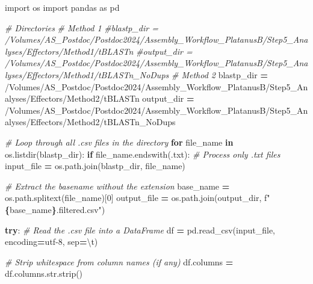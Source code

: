 \documentclass[
]{book}
\newenvironment{Shaded}{\begin{snugshade}}{\end{snugshade}}
\newcommand{\BuiltInTok}[1]{#1}
\newcommand{\CharTok}[1]{\textcolor[rgb]{0.31,0.60,0.02}{#1}}
\newcommand{\CommentTok}[1]{\textcolor[rgb]{0.56,0.35,0.01}{\textit{#1}}}
\newcommand{\ControlFlowTok}[1]{\textcolor[rgb]{0.13,0.29,0.53}{\textbf{#1}}}
\newcommand{\DecValTok}[1]{\textcolor[rgb]{0.00,0.00,0.81}{#1}}
\newcommand{\ImportTok}[1]{#1}
\newcommand{\KeywordTok}[1]{\textcolor[rgb]{0.13,0.29,0.53}{\textbf{#1}}}
\newcommand{\NormalTok}[1]{#1}
\newcommand{\OperatorTok}[1]{\textcolor[rgb]{0.81,0.36,0.00}{\textbf{#1}}}
\newcommand{\SpecialCharTok}[1]{\textcolor[rgb]{0.81,0.36,0.00}{\textbf{#1}}}
\newcommand{\SpecialStringTok}[1]{\textcolor[rgb]{0.31,0.60,0.02}{#1}}
\newcommand{\StringTok}[1]{\textcolor[rgb]{0.31,0.60,0.02}{#1}}
\begin{document}
\begin{Shaded}
\begin{Highlighting}[]
\ImportTok{import}\NormalTok{ os}
\ImportTok{import}\NormalTok{ pandas }\ImportTok{as}\NormalTok{ pd}

\CommentTok{\# Directories}
\CommentTok{\# Method 1}
\CommentTok{\#blastp\_dir = \textquotesingle{}/Volumes/AS\_Postdoc/Postdoc2024/Assembly\_Workflow\_PlatanusB/Step5\_Analyses/Effectors/Method1/tBLASTn\textquotesingle{}}
\CommentTok{\#output\_dir = \textquotesingle{}/Volumes/AS\_Postdoc/Postdoc2024/Assembly\_Workflow\_PlatanusB/Step5\_Analyses/Effectors/Method1/tBLASTn\_NoDups\textquotesingle{}}
\CommentTok{\# Method 2}
\NormalTok{blastp\_dir }\OperatorTok{=} \StringTok{\textquotesingle{}/Volumes/AS\_Postdoc/Postdoc2024/Assembly\_Workflow\_PlatanusB/Step5\_Analyses/Effectors/Method2/tBLASTn\textquotesingle{}}
\NormalTok{output\_dir }\OperatorTok{=} \StringTok{\textquotesingle{}/Volumes/AS\_Postdoc/Postdoc2024/Assembly\_Workflow\_PlatanusB/Step5\_Analyses/Effectors/Method2/tBLASTn\_NoDups\textquotesingle{}}

\CommentTok{\# Loop through all .csv files in the directory}
\ControlFlowTok{for}\NormalTok{ file\_name }\KeywordTok{in}\NormalTok{ os.listdir(blastp\_dir):}
    \ControlFlowTok{if}\NormalTok{ file\_name.endswith(}\StringTok{\textquotesingle{}.txt\textquotesingle{}}\NormalTok{):  }\CommentTok{\# Process only .txt files}
\NormalTok{        input\_file }\OperatorTok{=}\NormalTok{ os.path.join(blastp\_dir, file\_name)}
        
        \CommentTok{\# Extract the basename without the extension}
\NormalTok{        base\_name }\OperatorTok{=}\NormalTok{ os.path.splitext(file\_name)[}\DecValTok{0}\NormalTok{]}
\NormalTok{        output\_file }\OperatorTok{=}\NormalTok{ os.path.join(output\_dir, }\SpecialStringTok{f"}\SpecialCharTok{\{}\NormalTok{base\_name}\SpecialCharTok{\}}\SpecialStringTok{.filtered.csv"}\NormalTok{)}
        
        \ControlFlowTok{try}\NormalTok{:}
            \CommentTok{\# Read the .csv file into a DataFrame}
\NormalTok{            df }\OperatorTok{=}\NormalTok{ pd.read\_csv(input\_file, encoding}\OperatorTok{=}\StringTok{\textquotesingle{}utf{-}8\textquotesingle{}}\NormalTok{, sep}\OperatorTok{=}\StringTok{\textquotesingle{}}\CharTok{\textbackslash{}t}\StringTok{\textquotesingle{}}\NormalTok{) }
            
            \CommentTok{\# Strip whitespace from column names (if any)}
\NormalTok{            df.columns }\OperatorTok{=}\NormalTok{ df.columns.}\BuiltInTok{str}\NormalTok{.strip()}
            

\end{Highlighting}
\end{Shaded}
\end{document}
